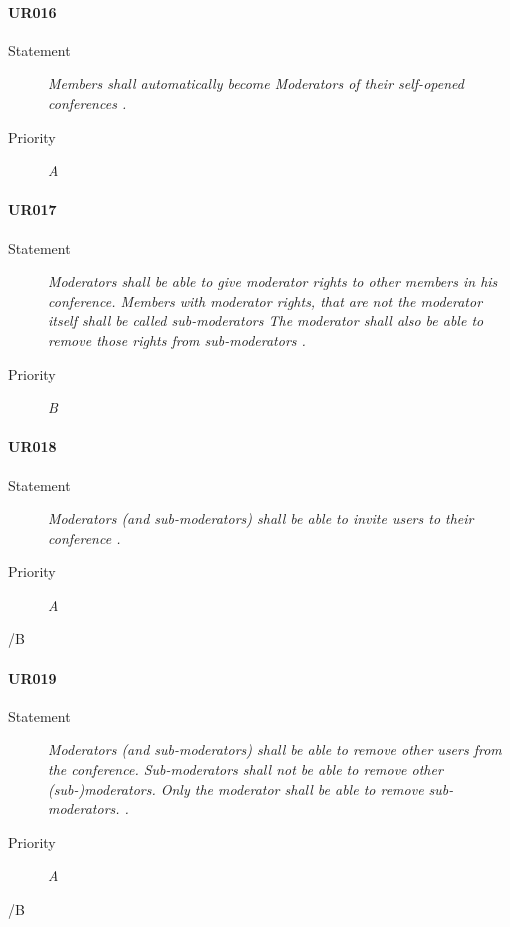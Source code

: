 \paragraph{UR016}
  \begin{description}
  \item [Statement] 
    \textit{ Members shall automatically become Moderators of their self-opened conferences
    .}
  \item [Priority] \textit{A}
\end{description}
    
\paragraph{UR017}
  \begin{description}
  \item [Statement] 
    \textit{ Moderators shall be able to give moderator rights to other members in his conference.
            Members with moderator rights, that are not the moderator itself shall be called sub-moderators
            The moderator shall also be able to remove those rights from sub-moderators
    .}
  \item [Priority] \textit{B}
\end{description}

\paragraph{UR018}
  \begin{description}
  \item [Statement] 
    \textit{ Moderators (and sub-moderators) shall be able to invite users to their conference
    .}
  \item [Priority] \textit{A}
\end{description}/B

\paragraph{UR019}
  \begin{description}
  \item [Statement] 
    \textit{ Moderators (and sub-moderators) shall be able to remove other users from the conference.
            Sub-moderators shall not be able to remove other (sub-)moderators.
            Only the moderator shall be able to remove sub-moderators.
    .}
  \item [Priority] \textit{A}
\end{description}/B
    
